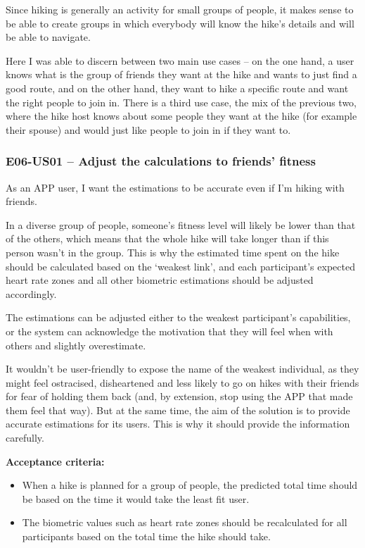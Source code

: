 Since hiking is generally an activity for small groups of people, it makes sense to be able to create groups in which everybody will know the hike's details and will be able to navigate.

Here I was able to discern between two main use cases -- on the one hand, a user knows what is the group of friends they want at the hike and wants to just find a good route,
and on the other hand, they want to hike a specific route and want the right people to join in.
There is a third use case, the mix of the previous two, where the hike host knows about some people they want at the hike (for example their spouse) and would just like people to join in if they want to.

\subsubsection*{E06-US01 -- Adjust the calculations to friends' fitness}
As an APP user, I want the estimations to be accurate even if I'm hiking with friends.

In a diverse group of people, someone's fitness level will likely be lower than that of the others, which means that the whole hike will take longer than if this person wasn't in the group.
This is why the estimated time spent on the hike should be calculated based on the `weakest link', and each participant's expected heart rate zones and all other biometric estimations should be adjusted accordingly.

The estimations can be adjusted either to the weakest participant's capabilities, or the system can acknowledge the motivation that they will feel when with others and slightly overestimate.

It wouldn't be user-friendly to expose the name of the weakest individual, as they might feel ostracised, disheartened and less likely to go on hikes with their friends for fear of holding them back
(and, by extension, stop using the APP that made them feel that way).
But at the same time, the aim of the solution is to provide accurate estimations for its users.
This is why it should provide the information carefully.

\textbf{Acceptance criteria:}
\begin{itemize}
    \item When a hike is planned for a group of people, the predicted total time should be based on the time it would take the least fit user.
    \item The biometric values such as heart rate zones should be recalculated for all participants based on the total time the hike should take.
\end{itemize}

